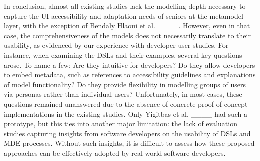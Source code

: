 In conclusion, almost all existing studies lack the modelling depth necessary to capture the UI accessibility and adaptation needs of seniors at the metamodel layer, with the exception of Bendaly Hlaoui et al. ____. However, even in that case, the comprehensiveness of the models does not necessarily translate to their usability, as evidenced by our experience with developer user studies. For instance, when examining the DSLs and their examples, several key questions arose. To name a few: Are they intuitive for developers? Do they allow developers to embed metadata, such as references to accessibility guidelines and explanations of model functionality? Do they provide flexibility in modelling groups of users via personas rather than individual users? Unfortunately, in most cases, these questions remained unanswered due to the absence of concrete proof-of-concept implementations in the existing studies. Only Yigitbas et al. ____ had such a prototype, but this ties into another major limitation: the lack of evaluation studies capturing insights from software developers on the usability of DSLs and MDE processes. Without such insights, it is difficult to assess how these proposed approaches can be effectively adopted by real-world software developers.